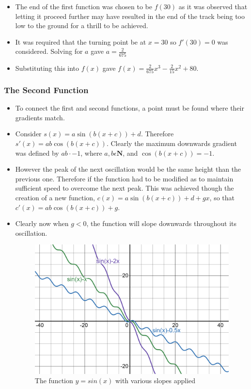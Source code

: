 \documentclass[11pt, letterpaper]{article}
\begin{document}
\begin{itemize}
	

	\item The end of the first function was chosen to be $f(30)$ as it was observed that letting it proceed further may have resulted in the end of the track being too low to the ground for a thrill to be achieved.
	\item It was required that the turning point be at $x=30$ so $f'(30)=0$ was considered. Solving for $a$ gave $a=\frac{2}{675}$
	\item Substituting this into $f(x)$ gave $f(x)=\frac{2}{675}x^{3}-\frac{2}{15}x^{2}+80$.
\end{itemize}
\subsubsection{The Second Function}
\begin{itemize}
	\item To connect the first and second functions, a point must be found where their gradients match.
	\item Consider $s(x)=a\sin(b(x+c))+d$. Therefore $s'(x)=ab\cos(b(x+c))$. Clearly the maximum downwards gradient was defined by $ab\cdot-1$, where $a,b \epsilon \mathbf{N}$, and $\cos(b(x+c))=-1$.
	\item However the peak of the next oscillation would be the same height than the previous one. Therefore if the function  had to be modified as to maintain sufficient speed to overcome the next peak. This was achieved though the creation of a new function, $c(x)=a\sin(b(x+c))+d+gx$, so that $c'(x)=ab\cos(b(x+c))+g$.
	\item Clearly now when $g<0$, the function will slope downwards throughout its oscillation. 

	\begin{figure}[h]
		\centering
		\includegraphics[width=15cm]{c(x).png}
		\caption{The function $y=sin(x)$ with various slopes applied}
	\end{figure}
	

\end{itemize}
\end{document}
